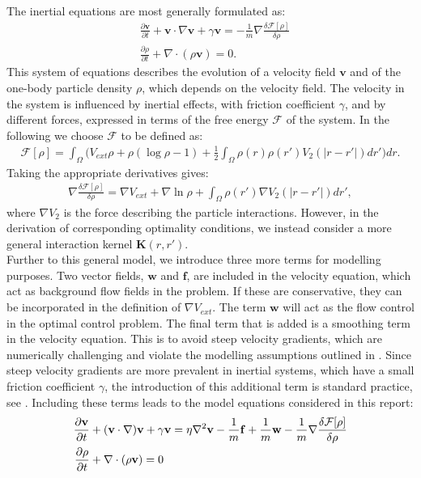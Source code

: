 \documentclass[11pt, a4paper]{article}
\theoremstyle{definition}
\newcommand{\Sta}{\rho}
\newcommand{\Stav}{\mathbf{v}}
\newcommand{\Con}{\mathbf{f}}
\begin{document}
The inertial equations are most generally formulated as:
\begin{align*}
	&\frac{\partial \Stav}{\partial t} + \Stav \cdot \nabla \Stav + \gamma \Stav = - \frac{1}{m} \nabla \frac{\delta \mathcal{F}[\Sta]}{\delta \Sta}\\
	&\frac{\partial \Sta}{\partial t} + \nabla \cdot (\Sta \Stav) =0.
\end{align*}
This system of equations describes the evolution of a velocity field $\Stav$ and of the one-body particle density $\Sta$, which depends on the velocity field.
The velocity in the system is influenced by inertial effects, with friction coefficient $\gamma$, and by different forces, expressed in terms of the free energy $\mathcal{F}$ of the system.
In the following we choose $\mathcal{F}$ to be defined as:
\begin{align}
\label{eqn:freeenergy1}
\mathcal{F}[\Sta]=\int_\Omega  \bigg( V_{ext}\Sta + \Sta (\log \Sta -1) +  \frac{1}{2}\int_\Omega \Sta(r) \Sta(r')V_2(|r-r'|)dr' \bigg) dr.
\end{align}
Taking the appropriate derivatives gives:
\begin{align*}
 \nabla \frac{\delta \mathcal{F}[\Sta]}{\delta \Sta} = \nabla V_{ext} + \nabla \ln \Sta + \int_\Omega \Sta(r') \nabla V_2(|r-r'|)dr',
\end{align*}
where $\nabla V_2$ is the force describing the particle interactions. However, in the derivation of corresponding optimality conditions, we instead consider a more general interaction kernel $\mathbf{K}(r,r')$.
\\
Further to this general model, we introduce three more terms for modelling purposes. Two vector fields, $\mathbf{w}$ and $\Con$, are included in the velocity equation, which act as background flow fields in the problem. If these are conservative, they can be incorporated in the definition of $\nabla V_{ext}$. The term $\mathbf{w}$ will act as the flow control in the optimal control problem.
The final term that is added is a smoothing term in the velocity equation. This is to avoid steep velocity gradients, which are numerically challenging and violate the modelling assumptions outlined in \cite{Archer1}. Since steep velocity gradients are more prevalent in inertial systems, which have a small friction coefficient $\gamma$, the introduction of this additional term is standard practice, see \cite{Archer1}.
Including these terms leads to the model equations considered in this report:
\begin{align}
\label{eqn:INeqns1}
\frac{\partial \Stav}{\partial t} &+ (\Stav \cdot \nabla)\Stav + \gamma \Stav=\eta \nabla^2 \Stav  -\frac{1}{m}\Con +\frac{1}{m}\mathbf{w} - \frac{1}{m}\nabla \frac{\delta \mathcal{F}[\Sta]}{\delta \Sta}\\
\frac{\partial \Sta}{\partial t} &+ \nabla \cdot (\Sta \Stav)=0 \notag
\end{align}
\end{document}
